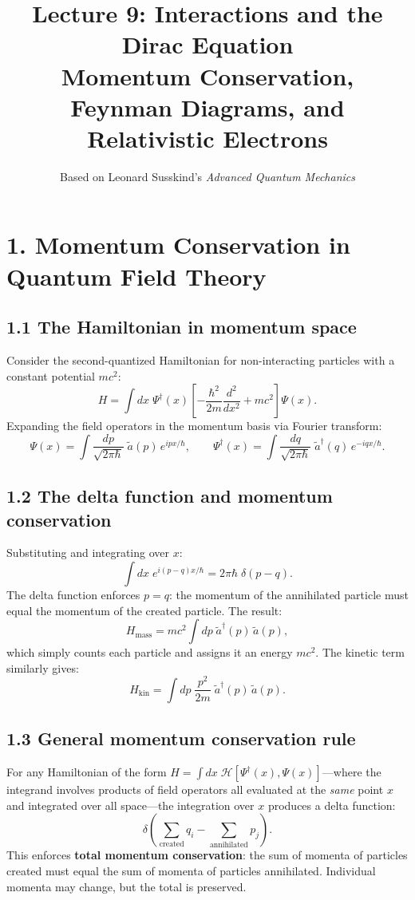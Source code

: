 \documentclass[12pt,a4paper]{article}
\title{\textbf{Lecture 9: Interactions and the Dirac Equation} \\ \large Momentum Conservation, Feynman Diagrams, and Relativistic Electrons}
\author{Based on Leonard Susskind's \textit{Advanced Quantum Mechanics}}
\date{}
\begin{document}
\maketitle
\thispagestyle{fancy}

\section{1. Momentum Conservation in Quantum Field Theory}

\subsection{1.1 The Hamiltonian in momentum space}

Consider the second-quantized Hamiltonian for non-interacting particles with a constant potential $mc^2$:
\[
    H = \int dx\;\Psi^\dagger(x)\left[-\frac{\hbar^2}{2m}\frac{d^2}{dx^2} + mc^2\right]\Psi(x).
\]
Expanding the field operators in the momentum basis via Fourier transform:
\[
    \Psi(x) = \int\frac{dp}{\sqrt{2\pi\hbar}}\;\tilde{a}(p)\,e^{ipx/\hbar}, \qquad
    \Psi^\dagger(x) = \int\frac{dq}{\sqrt{2\pi\hbar}}\;\tilde{a}^\dagger(q)\,e^{-iqx/\hbar}.
\]

\subsection{1.2 The delta function and momentum conservation}

Substituting and integrating over $x$:
\[
    \int dx\;e^{i(p - q)x/\hbar} = 2\pi\hbar\;\delta(p - q).
\]
The delta function enforces $p = q$: the momentum of the annihilated particle must equal the momentum of the created particle.  The result:
\[
    H_{\text{mass}} = mc^2\int dp\;\tilde{a}^\dagger(p)\,\tilde{a}(p),
\]
which simply counts each particle and assigns it an energy $mc^2$.  The kinetic term similarly gives:
\[
    H_{\text{kin}} = \int dp\;\frac{p^2}{2m}\;\tilde{a}^\dagger(p)\,\tilde{a}(p).
\]

\subsection{1.3 General momentum conservation rule}

For any Hamiltonian of the form $H = \int dx\;\mathcal{H}[\Psi^\dagger(x), \Psi(x)]$---where the integrand involves products of field operators all evaluated at the \emph{same} point $x$ and integrated over all space---the integration over $x$ produces a delta function:
\[
    \delta\!\left(\sum_{\text{created}} q_i - \sum_{\text{annihilated}} p_j\right).
\]
This enforces \textbf{total momentum conservation}: the sum of momenta of particles created must equal the sum of momenta of particles annihilated.  Individual momenta may change, but the total is preserved.
\end{document}
